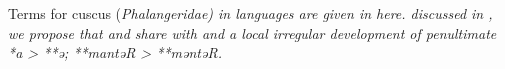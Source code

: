 Terms for cuscus (\it{Phalangeridae}) in 
languages are given in here.
 discussed in ,
we propose that 
and  share with 
and  a local irregular development of penultimate *a > **ə;
\mbox{**mantəR} > **məntəR.

%

